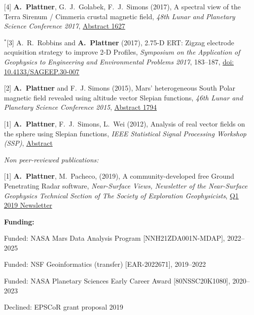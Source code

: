 \documentclass[10pt]{article}
\begin{document}
\spcp
\hspace{-0.5cm}[4] \textbf{A.~Plattner}, G.~J.~Golabek, F.~J.~Simons (2017),
A spectral view of the Terra Sirenum / Cimmeria crustal magnetic
field,
\emph{48th Lunar and Planetary Science Conference 2017},
\href{http://www.lpi.usra.edu/meetings/lpsc2017/pdf/1627.pdf}{Abstract 1627}

\spcp
\hspace{-0.67cm}$^*$[3] A.~R.~Robbins and \textbf{A.~Plattner}
(2017),
2.75-D ERT: Zigzag electrode acquisition strategy to improve 2-D
Profiles,
\emph{Symposium on the Application of Geophysics to Engineering and
  Environmental Problems 2017}, 183--187,
\href{http://library.seg.org/doi/pdf/10.4133/SAGEEP.30-007}{doi: 10.4133/SAGEEP.30-007}

\newpage
\hspace{-0.5cm}[2] \textbf{A.~Plattner} and F.~J. Simons (2015),
Mars' heterogeneous South Polar magnetic field revealed using altitude vector Slepian functions,
\emph{46th Lunar and Planetary Science Conference 2015},
\href{http://www.hou.usra.edu/meetings/lpsc2015/pdf/1794.pdf}{Abstract 1794}

\spcp
\hspace{-0.5cm}[1] \textbf{A.~Plattner}, F.~J.~Simons, L.~Wei (2012),
Analysis of real vector fields on the sphere using Slepian functions,
\emph{IEEE Statistical Signal Processing Workshop (SSP)},
\href{http://ieeexplore.ieee.org/stamp/stamp.jsp?tp=&arnumber=6319659}{Abstract}

\spc
\emph{Non peer-reviewed publications:}

\spcp
\hspace{-0.5cm}[1] \textbf{A.~Plattner}, M.~Pacheco, (2019), A
community-developed free Ground Penetrating Radar software,
\emph{Near-Surface Views, Newsletter of the Near-Surface Geophysics
  Technical Section of The Society of Exploration Geophysicists},
\href{https://seg.org/Portals/0/SEG/News%20and%20Resources/Near%20Surface/Near%20Surface%20Newsletter/2011-present/2019_Q1.pdf}{Q1
  2019 Newsletter}


\spc
\textbf{\tsize Funding:}

\spcp
Funded: NASA Mars Data Analysis Program [NNH21ZDA001N-MDAP], 2022--2025

\spcp
Funded: NSF Geoinformatics (transfer) [EAR-2022671], 2019--2022 

\spcp
Funded: NASA Planetary Sciences Early Career Award [80NSSC20K1080], 2020--2023

\spcp Declined: EPSCoR grant proposal 2019
\end{document}
